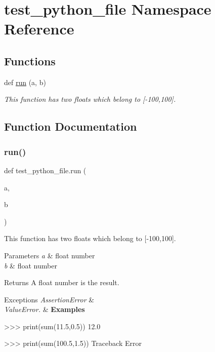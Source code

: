 \hypertarget{namespacetest__python__file}{}\section{test\+\_\+python\+\_\+file Namespace Reference}
\label{namespacetest__python__file}
\subsection*{Functions}
\begin{DoxyCompactItemize}
\item 
def \mbox{\hyperlink{namespacetest__python__file_a1e6355f53ccc94cf014f8d83d764c3b7}{run}} (a, b)
\begin{DoxyCompactList}\small\item\em This function has two floats which belong to \mbox{[}-\/100,100\mbox{]}. \end{DoxyCompactList}\end{DoxyCompactItemize}


\subsection{Function Documentation}
\mbox{\label{namespacetest__python__file_a1e6355f53ccc94cf014f8d83d764c3b7}} 
\subsubsection{\texorpdfstring{run()}{run()}}
{\footnotesize\ttfamily def test\+\_\+python\+\_\+file.\+run (\begin{DoxyParamCaption}\item[{}]{a,  }\item[{}]{b }\end{DoxyParamCaption})}



This function has two floats which belong to \mbox{[}-\/100,100\mbox{]}. 


\begin{DoxyParams}{Parameters}
{\em a} & float number \\
\hline
{\em b} & float number\\
\hline
\end{DoxyParams}
\begin{DoxyReturn}{Returns}
A float number is the result.
\end{DoxyReturn}

\begin{DoxyExceptions}{Exceptions}
{\em Assertion\+Error} & \\
\hline
{\em Value\+Error.} & {\bfseries Examples} 
\begin{DoxyCode}
>>> print(sum(11.5,0.5))
12.0

>>> print(sum(100.5,1.5))
Traceback Error
\end{DoxyCode}
 \\
\hline
\end{DoxyExceptions}
